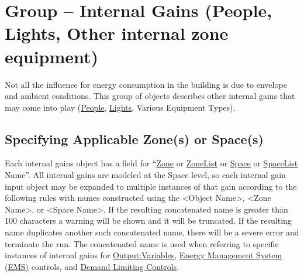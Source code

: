 \section[Group -- Internal Gains]{Group -- Internal Gains (People, Lights, Other internal zone equipment)}\label{group-internal-gains-people-lights-other}

Not all the influence for energy consumption in the building is due to envelope and ambient conditions. This group of objects describes other internal gains that may come into play (\hyperref[people]{People}, \hyperref[lights-000]{Lights}, Various Equipment Types).

\subsection{Specifying Applicable Zone(s) or Space(s)}\label{specifying-applicable-zones-or-spaces}
Each internal gains object has a field for ``\hyperref[zone]{Zone} or  \hyperref[zonelist]{ZoneList} or \hyperref[space]{Space} or  \hyperref[spacelist]{SpaceList} Name''. All internal gains are modeled at the Space level, so each internal gain input object may be expanded to multiple instances of that gain according to the following rules with names constructed using the \textless{}Object Name\textgreater{}, \textless{}Zone Name\textgreater{}, or \textless{}Space Name\textgreater{}. If the resulting concatenated name is greater than 100 characters a warning will be shown and it will be truncated. If the resulting name duplicates another such concatenated name, there will be a severe error and terminate the run. The concatenated name is used when referring to specific instances of internal gains for \hyperref[outputvariable]{Output:Variables}, \hyperref[group-energy-management-system-ems]{Energy Management System (EMS)} controls, and \hyperref[group-demand-limiting-controls]{Demand Limiting Controls}.

